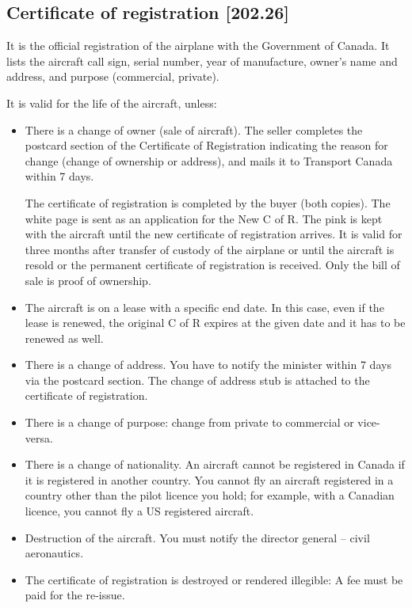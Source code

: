 \documentclass[12pt,letterpaper]{article}
\begin{document}
    \subsection{Certificate of registration [202.26]}

    It is the official registration of the airplane with the Government of Canada. It lists the aircraft call sign, serial number, year of manufacture, owner’s name and address, and purpose (commercial, private).

    It is valid for the life of the aircraft, unless:
    \begin{itemize}
        \item There is a change of owner (sale of aircraft). The seller completes the postcard section of the Certificate of Registration indicating the reason for change (change of ownership or address), and mails it to Transport Canada within 7 days.
        
        The certificate of registration is completed by the buyer (both copies). The white page is sent as an application for the New C of R. The pink is kept with the aircraft until the new certificate of registration arrives. It is valid for three months after transfer of custody of the airplane or until the aircraft is resold or the permanent certificate of registration is received. Only the bill of sale is proof of ownership.
        
        \item The aircraft is on a lease with a specific end date. In this case, even if the lease is renewed, the original C of R expires at the given date and it has to be renewed as well.
        
        \item There is a change of address. You have to notify the minister within 7 days via the postcard section. The change of address stub is attached to the certificate of registration.

        \item There is a change of purpose: change from private to commercial or vice-versa.
        
        \item There is a change of nationality. An aircraft cannot be registered in Canada if it is registered in another country. You cannot fly an aircraft registered in a country other than the pilot licence you hold; for example, with a Canadian licence, you cannot fly a US registered aircraft. 
        
        \item Destruction of the aircraft. You must notify the director general – civil aeronautics.

        \item The certificate of registration is destroyed or rendered illegible: A fee must be paid for the re-issue.
    \end{itemize}
\end{document}
